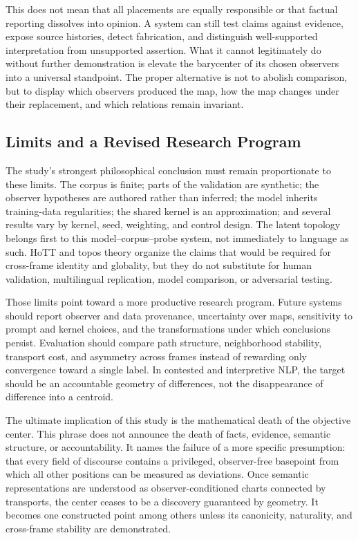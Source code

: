 This does not mean that all placements are equally responsible or that factual reporting dissolves into opinion. A system can still test claims against evidence, expose source histories, detect fabrication, and distinguish well-supported interpretation from unsupported assertion. What it cannot legitimately do without further demonstration is elevate the barycenter of its chosen observers into a universal standpoint. The proper alternative is not to abolish comparison, but to display which observers produced the map, how the map changes under their replacement, and which relations remain invariant.

\subsection{Limits and a Revised Research Program}

The study's strongest philosophical conclusion must remain proportionate to these limits. The corpus is finite; parts of the validation are synthetic; the observer hypotheses are authored rather than inferred; the model inherits training-data regularities; the shared kernel is an approximation; and several results vary by kernel, seed, weighting, and control design. The latent topology belongs first to this model--corpus--probe system, not immediately to language as such. HoTT and topos theory organize the claims that would be required for cross-frame identity and globality, but they do not substitute for human validation, multilingual replication, model comparison, or adversarial testing.

Those limits point toward a more productive research program. Future systems should report observer and data provenance, uncertainty over maps, sensitivity to prompt and kernel choices, and the transformations under which conclusions persist. Evaluation should compare path structure, neighborhood stability, transport cost, and asymmetry across frames instead of rewarding only convergence toward a single label. In contested and interpretive NLP, the target should be an accountable geometry of differences, not the disappearance of difference into a centroid.


The ultimate implication of this study is the mathematical death of the objective center. This phrase does not announce the death of facts, evidence, semantic structure, or accountability. It names the failure of a more specific presumption: that every field of discourse contains a privileged, observer-free basepoint from which all other positions can be measured as deviations. Once semantic representations are understood as observer-conditioned charts connected by transports, the center ceases to be a discovery guaranteed by geometry. It becomes one constructed point among others unless its canonicity, naturality, and cross-frame stability are demonstrated.

